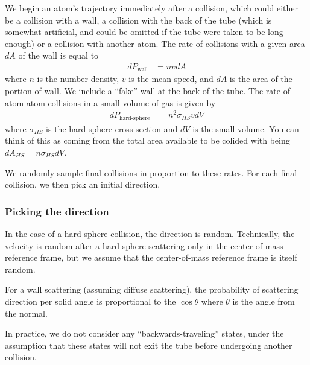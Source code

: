 \documentclass{article}
\begin{document}
We begin an atom's trajectory immediately after a collision, which
could either be a collision with a wall, a collision with the back of
the tube (which is somewhat artificial, and could be omitted if the
tube were taken to be long enough) or a collision with another
atom.  The rate of collisions with a given area $dA$ of the
wall is equal to
\begin{align}
  dP_{\text{wall}} &= nvdA
\end{align}
where $n$ is the number density, $v$ is the mean speed, and $dA$ is
the area of the portion of wall.  We include a ``fake'' wall at the
back of the tube.  The rate of atom-atom collisions in a small volume
of gas is given by
\begin{align}
  dP_{\text{hard-sphere}} &= n^2\sigma_{HS}v dV
\end{align}
where $\sigma_{HS}$ is the hard-sphere cross-section and $dV$ is the
small volume. You can think of this as coming from the total area
available to be colided with being $dA_{HS} = n\sigma_{HS}dV$.

We randomly sample final collisions in proportion to these rates.  For
each final collision, we then pick an initial direction.

\subsubsection{Picking the direction}
In the case of a hard-sphere collision, the direction is random.
Technically, the velocity is random after a hard-sphere scattering
only in the center-of-mass reference frame, but we assume that the
center-of-mass reference frame is itself random.

For a wall scattering (assuming diffuse scattering), the probability
of scattering direction per solid angle is proportional to the
$\cos\theta$ where $\theta$ is the angle from the normal.

In practice, we do not consider any ``backwards-traveling'' states,
under the assumption that these states will not exit the tube before
undergoing another collision.
\end{document}

